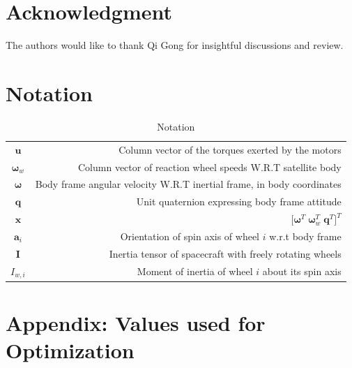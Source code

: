 \documentclass[letterpaper, paper,11pt]{AAS}
\begin{document}
\section{Acknowledgment}
The authors would like to thank Qi Gong for insightful discussions and review.

\section{Notation}
\begin{table}[h!]
	\fontsize{10}{10}\selectfont
    \caption{Notation}
   \label{tab:notation}
        \centering 
   \begin{tabular}{c r } %
      \hline 
      $\mathbf{u}$ & Column vector of the torques exerted by the motors  \\
      $\pmb{\omega}_{w}$      & Column vector of reaction wheel speeds W.R.T satellite body \\
      $\pmb{\omega}$       & Body frame angular velocity W.R.T inertial frame, in body coordinates \\
      $\pmb{q}$      & Unit quaternion expressing body frame attitude \\
      $\pmb{x}$ & $\lbrack 
      \pmb{\omega}^T \;\pmb{\omega}_{w}^{T} \; \pmb{q}^{T}
      \rbrack^{T}$\\
      $\pmb{a}_{i}$ & Orientation of spin axis of wheel $i$ w.r.t body frame \\
      $\pmb{I}$ & Inertia tensor of spacecraft with freely rotating wheels \\
      $I_{w,i}$ & Moment of inertia of wheel $i$ about its spin axis \\
      \hline
   \end{tabular}
\end{table}

\section{Appendix: Values used for Optimization}
\label{app:Numerical Values}
\end{document}
